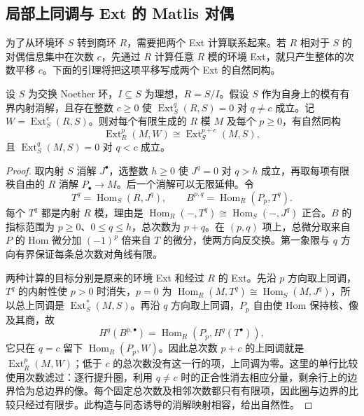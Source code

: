 \subsection{局部上同调与 Ext 的 Matlis 对偶}
\label{b3:subsec:2202:06}

为了从环境环 \(S\) 转到商环 \(R\)，需要把两个 Ext 计算联系起来。若 \(R\) 相对于 \(S\) 的对偶信息集中在次数 \(c\)，先通过 \(R\) 计算任意 \(R\) 模的环境 Ext，就只产生整体的次数平移 \(c\)。下面的引理将把这项平移写成两个 Ext 的自然同构。

\begin{lemma}\label{b3:lem:canonical-change-of-rings}
	设 \(S\) 为交换 Noether 环，\(I\subseteq S\) 为理想，\(R=S/I\)。假设 \(S\) 作为自身上的模有有界内射消解，且存在整数 \(c\ge0\) 使 \(\operatorname{Ext}_S^q(R,S)=0\) 对 \(q\ne c\) 成立。记 \(W=\operatorname{Ext}_S^c(R,S)\)。则对每个有限生成的 \(R\) 模 \(M\) 及每个 \(p\ge0\)，有自然同构
	\[
		\operatorname{Ext}_R^p(M,W) \cong\operatorname{Ext}_S^{p+c}(M,S),
	\]
	且 \(\operatorname{Ext}_S^q(M,S)=0\) 对 \(q<c\) 成立。
\end{lemma}
\begin{proof}
	取内射 \(S\) 消解 \(J^\bullet\)，选整数 \(h\ge0\) 使 \(J^q=0\) 对 \(q>h\) 成立，再取每项有限秩自由的 \(R\) 消解 \(P_\bullet\rightarrow M\)。后一个消解可以无限延伸。令
	\[
		T^q=\operatorname{Hom}_S(R,J^q), \qquad B^{p,q}=\operatorname{Hom}_R(P_p,T^q).
	\]
	每个 \(T^q\) 都是内射 \(R\) 模，理由是 \(\operatorname{Hom}_R(-,T^q)\cong\operatorname{Hom}_S(-,J^q)\) 正合。\(B\) 的指标范围为 \(p\ge0\)、\(0\le q\le h\)，总次数为 \(p+q\)。在 \((p,q)\) 项上，总微分取来自 \(P\) 的 Hom 微分加 \((-1)^p\) 倍来自 \(T\) 的微分，使两方向反交换。第一象限与 \(q\) 方向有界保证每条总次数对角线有限。

	两种计算的目标分别是原来的环境 Ext 和经过 \(R\) 的 Ext。先沿 \(p\) 方向取上同调，\(T^q\) 的内射性使 \(p>0\) 时消失，\(p=0\) 为 \(\operatorname{Hom}_R(M,T^q)\cong\operatorname{Hom}_S(M,J^q)\)，所以总上同调是 \(\operatorname{Ext}_S^*(M,S)\)。再沿 \(q\) 方向取上同调，\(P_p\) 自由使 Hom 保持核、像及其商，故
	\[
		H^q(B^{p,\bullet}) =\operatorname{Hom}_R(P_p,H^q(T^\bullet)),
	\]
	它只在 \(q=c\) 留下 \(\operatorname{Hom}_R(P_p,W)\)。因此总次数 \(p+c\) 的上同调就是 \(\operatorname{Ext}_R^p(M,W)\)；低于 \(c\) 的总次数没有这一行的项，上同调为零。这里的单行比较使用次数滤过：逐行提升圈，利用 \(q\ne c\) 时的正合性消去相应分量，剩余行上的边界恰为总边界的像。每个固定总次数及相邻次数都只有有限项，因此圈与边界的比较只经过有限步。此构造与同态诱导的消解映射相容，给出自然性。
\end{proof}

